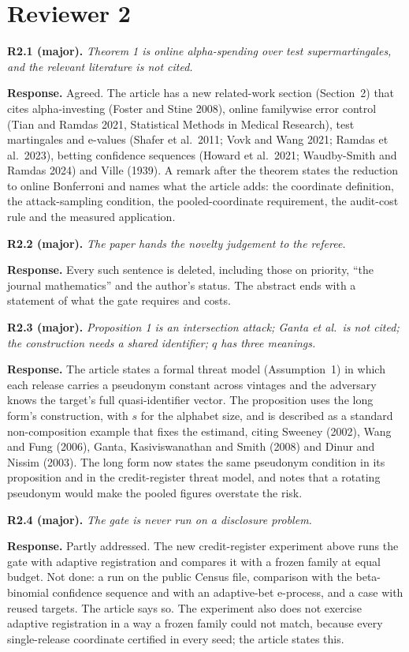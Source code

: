 \documentclass[11pt,a4paper]{article}
\newcommand{\point}[2]{\par\medskip\textbf{#1} \emph{#2}\par}
\newcommand{\reply}{\textbf{Response.} }
\begin{document}
\section*{Reviewer 2}

\point{R2.1 (major).}{Theorem 1 is online alpha-spending over test supermartingales, and
the relevant literature is not cited.}
\reply Agreed. The article has a new related-work section (Section~2) that cites
alpha-investing (Foster and Stine 2008), online familywise error control (Tian and
Ramdas 2021, Statistical Methods in Medical Research), test martingales and e-values
(Shafer et al.\ 2011; Vovk and Wang 2021; Ramdas et al.\ 2023), betting confidence
sequences (Howard et al.\ 2021; Waudby-Smith and Ramdas 2024) and Ville (1939). A remark
after the theorem states the reduction to online Bonferroni and names what the article
adds: the coordinate definition, the attack-sampling condition, the pooled-coordinate
requirement, the audit-cost rule and the measured application.

\point{R2.2 (major).}{The paper hands the novelty judgement to the referee.}
\reply Every such sentence is deleted, including those on priority, ``the journal
mathematics'' and the author's status. The abstract ends with a statement of what the
gate requires and costs.

\point{R2.3 (major).}{Proposition 1 is an intersection attack; Ganta et al.\ is not
cited; the construction needs a shared identifier; $q$ has three meanings.}
\reply The article states a formal threat model (Assumption~1) in which each release
carries a pseudonym constant across vintages and the adversary knows the target's full
quasi-identifier vector. The proposition uses the long form's construction, with $s$
for the alphabet size, and is described as a standard non-composition example that
fixes the estimand, citing Sweeney (2002), Wang and Fung (2006), Ganta, Kasiviswanathan
and Smith (2008) and Dinur and Nissim (2003). The long form now states the same
pseudonym condition in its proposition and in the credit-register threat model, and
notes that a rotating pseudonym would make the pooled figures overstate the risk.

\point{R2.4 (major).}{The gate is never run on a disclosure problem.}
\reply Partly addressed. The new credit-register experiment above runs the gate with
adaptive registration and compares it with a frozen family at equal budget. Not done: a
run on the public Census file, comparison with the beta-binomial confidence sequence and
with an adaptive-bet e-process, and a case with reused targets. The article says so. The
experiment also does not exercise adaptive registration in a way a frozen family could
not match, because every single-release coordinate certified in every seed; the article
states this.
\end{document}
